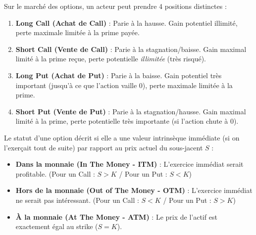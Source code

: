 \begin{definitionbox}
Sur le marché des options, un acteur peut prendre 4 positions distinctes :
\begin{enumerate}
    \item \textbf{Long Call (Achat de Call)} : Parie à la hausse. Gain potentiel illimité, perte maximale limitée à la prime payée.
    \item \textbf{Short Call (Vente de Call)} : Parie à la stagnation/baisse. Gain maximal limité à la prime reçue, perte potentielle \textit{illimitée} (très risqué).
    \item \textbf{Long Put (Achat de Put)} : Parie à la baisse. Gain potentiel très important (jusqu'à ce que l'action vaille 0), perte maximale limitée à la prime.
    \item \textbf{Short Put (Vente de Put)} : Parie à la stagnation/hausse. Gain maximal limité à la prime, perte potentielle très importante (si l'action chute à 0).
\end{enumerate}
\end{definitionbox}

\begin{definitionbox}
Le statut d'une option décrit si elle a une valeur intrinsèque immédiate (si on l'exerçait tout de suite) par rapport au prix actuel du sous-jacent $S$ :
\begin{itemize}[label=$\cdot$]
    \item \textbf{Dans la monnaie (In The Money - ITM)} : L'exercice immédiat serait profitable.
        (Pour un Call : $S > K$ / Pour un Put : $S < K$)
    \item \textbf{Hors de la monnaie (Out of The Money - OTM)} : L'exercice immédiat ne serait pas intéressant.
        (Pour un Call : $S < K$ / Pour un Put : $S > K$)
    \item \textbf{À la monnaie (At The Money - ATM)} : Le prix de l'actif est exactement égal au strike ($S = K$).
\end{itemize}
\end{definitionbox}